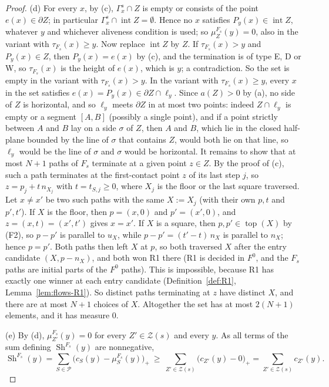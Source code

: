 \documentclass[11pt]{amsart}
\newcommand{\cP}{\mathcal P}
\newcommand{\cZ}{\mathcal Z}
\newcommand{\Top}{\operatorname{top}}
\newcommand{\Sh}{\operatorname{Sh}}
\newcommand{\Fz}{F^{0}}
\newcommand{\Fs}{F_{s}}
\theoremstyle{definition}
\theoremstyle{remark}
\numberwithin{equation}{section}
\begin{document}
\begin{proof}
(d) For every $x$, by (c), $\Gamma^s_x\cap Z$ is empty or consists of the point $e(x)\in\partial Z$; in particular $\Gamma^s_x\cap\operatorname{int}Z=\emptyset$. Hence no $x$ satisfies $P_y(x)\in\operatorname{int}Z$, whatever $y$ and whichever aliveness condition is used; so $\mu^{\Fs}_Z(y)=0$, also in the variant with $\tau_{\Fs}(x)\ge y$. Now replace $\operatorname{int}Z$ by $Z$. If $\tau_{\Fs}(x)>y$ and $P_y(x)\in Z$, then $P_y(x)=e(x)$ by (c), and the termination is of type E, D or W, so $\tau_{\Fs}(x)$ is the height of $e(x)$, which is $y$; a contradiction. So the set is empty in the variant with $\tau_{\Fs}(x)>y$. In the variant with $\tau_{\Fs}(x)\ge y$, every $x$ in the set satisfies $e(x)=P_y(x)\in\partial Z\cap\ell_y$. Since $a(Z)>0$ by (a), no side of $Z$ is horizontal, and so $\ell_y$ meets $\partial Z$ in at most two points: indeed $Z\cap\ell_y$ is empty or a segment $[A,B]$ (possibly a single point), and if a point strictly between $A$ and $B$ lay on a side $\sigma$ of $Z$, then $A$ and $B$, which lie in the closed half-plane bounded by the line of $\sigma$ that contains $Z$, would both lie on that line, so $\ell_y$ would be the line of $\sigma$ and $\sigma$ would be horizontal. It remains to show that at most $N+1$ paths of $\Fs$ terminate at a given point $z\in Z$. By the proof of (c), such a path terminates at the first-contact point $z$ of its last step $j$, so $z=p_j+t\,n_{X_j}$ with $t=t_{S,j}\ge0$, where $X_j$ is the floor or the last square traversed. Let $x\ne x'$ be two such paths with the same $X:=X_j$ (with their own $p,t$ and $p',t'$). If $X$ is the floor, then $p=(x,0)$ and $p'=(x',0)$, and $z=(x,t)=(x',t')$ gives $x=x'$. If $X$ is a square, then $p,p'\in\Top(X)$ by (F2), so $p-p'$ is parallel to $u_X$, while $p-p'=(t'-t)\,n_X$ is parallel to $n_X$; hence $p=p'$. Both paths then left $X$ at $p$, so both traversed $X$ after the entry candidate $(X,p-n_X)$, and both won R1 there (R1 is decided in $\Fz$, and the $\Fs$ paths are initial parts of the $\Fz$ paths). This is impossible, because R1 has exactly one winner at each entry candidate (Definition~\ref{def:R1}, Lemma~\ref{lem:flows-R1}). So distinct paths terminating at $z$ have distinct $X$, and there are at most $N+1$ choices of $X$. Altogether the set has at most $2(N+1)$ elements, and it has measure $0$.

(e) By (d), $\mu^{\Fs}_{Z'}(y)=0$ for every $Z'\in\cZ(s)$ and every $y$. As all terms of the sum defining $\Sh^{\Fs}(y)$ are nonnegative,
\[
\Sh^{\Fs}(y)=\sum_{S\in\cP}\bigl(c_S(y)-\mu^{\Fs}_S(y)\bigr)_+\ \ge\ \sum_{Z'\in\cZ(s)}\bigl(c_{Z'}(y)-0\bigr)_+=\sum_{Z'\in\cZ(s)}c_{Z'}(y).
\]


\end{proof}
\end{document}
